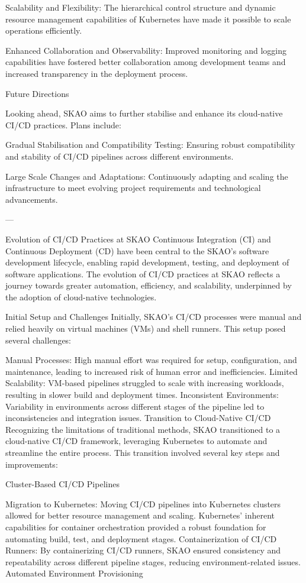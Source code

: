 \documentclass[a4paper]{spie}  %
\begin{document}
Scalability and Flexibility: The hierarchical control structure and dynamic resource management capabilities of Kubernetes have made it possible to scale operations efficiently.

Enhanced Collaboration and Observability: Improved monitoring and logging capabilities have fostered better collaboration among development teams and increased transparency in the deployment process.

Future Directions

Looking ahead, SKAO aims to further stabilise and enhance its cloud-native CI/CD practices. Plans include:

Gradual Stabilisation and Compatibility Testing: Ensuring robust compatibility and stability of CI/CD pipelines across different environments.

Large Scale Changes and Adaptations: Continuously adapting and scaling the infrastructure to meet evolving project requirements and technological advancements.

---

Evolution of CI/CD Practices at SKAO
Continuous Integration (CI) and Continuous Deployment (CD) have been central to the SKAO’s software development lifecycle, enabling rapid development, testing, and deployment of software applications. The evolution of CI/CD practices at SKAO reflects a journey towards greater automation, efficiency, and scalability, underpinned by the adoption of cloud-native technologies.

Initial Setup and Challenges
Initially, SKAO's CI/CD processes were manual and relied heavily on virtual machines (VMs) and shell runners. This setup posed several challenges:

Manual Processes: High manual effort was required for setup, configuration, and maintenance, leading to increased risk of human error and inefficiencies.
Limited Scalability: VM-based pipelines struggled to scale with increasing workloads, resulting in slower build and deployment times.
Inconsistent Environments: Variability in environments across different stages of the pipeline led to inconsistencies and integration issues.
Transition to Cloud-Native CI/CD
Recognizing the limitations of traditional methods, SKAO transitioned to a cloud-native CI/CD framework, leveraging Kubernetes to automate and streamline the entire process. This transition involved several key steps and improvements:

Cluster-Based CI/CD Pipelines

Migration to Kubernetes: Moving CI/CD pipelines into Kubernetes clusters allowed for better resource management and scaling. Kubernetes' inherent capabilities for container orchestration provided a robust foundation for automating build, test, and deployment stages.
Containerization of CI/CD Runners: By containerizing CI/CD runners, SKAO ensured consistency and repeatability across different pipeline stages, reducing environment-related issues.
Automated Environment Provisioning
\end{document}
